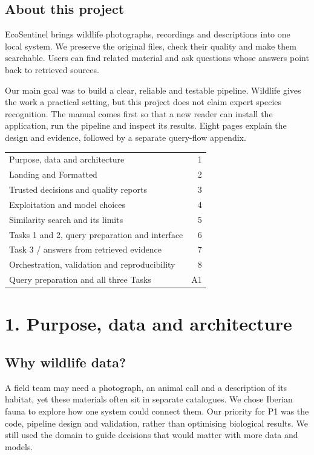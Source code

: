\documentclass[10pt,a4paper]{article}
\begin{document}
\subsection*{About this project}
EcoSentinel brings wildlife photographs, recordings and descriptions into one local system. We preserve the original files, check their quality and make them searchable. Users can find related material and ask questions whose answers point back to retrieved sources.

Our main goal was to build a clear, reliable and testable pipeline. Wildlife gives the work a practical setting, but this project does not claim expert species recognition. The manual comes first so that a new reader can install the application, run the pipeline and inspect its results. Eight pages explain the design and evidence, followed by a separate query-flow appendix.

\vfill
\begin{tabularx}{\linewidth}{@{}Y r@{}}
Purpose, data and architecture & 1\\
Landing and Formatted & 2\\
Trusted decisions and quality reports & 3\\
Exploitation and model choices & 4\\
Similarity search and its limits & 5\\
Tasks 1 and 2, query preparation and interface & 6\\
Task 3 / answers from retrieved evidence & 7\\
Orchestration, validation and reproducibility & 8\\
Query preparation and all three Tasks & A1
\end{tabularx}

\clearpage\setcounter{page}{1}
\section*{1. Purpose, data and architecture}
\subsection*{Why wildlife data?}
A field team may need a photograph, an animal call and a description of its habitat, yet these materials often sit in separate catalogues. We chose Iberian fauna to explore how one system could connect them. Our priority for P1 was the code, pipeline design and validation, rather than optimising biological results. We still used the domain to guide decisions that would matter with more data and models.
\end{document}

